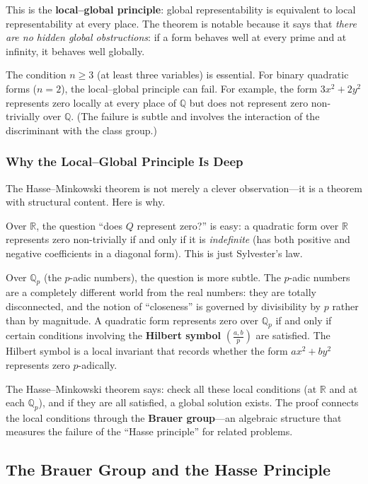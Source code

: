 This is the \textbf{local--global principle}: global representability is equivalent to local representability at every place. The theorem is notable because it says that \emph{there are no hidden global obstructions}: if a form behaves well at every prime and at infinity, it behaves well globally.

\begin{remark}
The condition $n \ge 3$ (at least three variables) is essential. For binary quadratic forms ($n = 2$), the local--global principle can fail. For example, the form $3x^2 + 2y^2$ represents zero locally at every place of $\mathbb{Q}$ but does not represent zero non-trivially over $\mathbb{Q}$. (The failure is subtle and involves the interaction of the discriminant with the class group.)
\end{remark}

\subsubsection{Why the Local--Global Principle Is Deep}

The Hasse--Minkowski theorem is not merely a clever observation---it is a theorem with structural content. Here is why.

Over $\mathbb{R}$, the question ``does $Q$ represent zero?'' is easy: a quadratic form over $\mathbb{R}$ represents zero non-trivially if and only if it is \emph{indefinite} (has both positive and negative coefficients in a diagonal form). This is just Sylvester's law.

Over $\mathbb{Q}_p$ (the $p$-adic numbers), the question is more subtle. The $p$-adic numbers are a completely different world from the real numbers: they are totally disconnected, and the notion of ``closeness'' is governed by divisibility by $p$ rather than by magnitude. A quadratic form represents zero over $\mathbb{Q}_p$ if and only if certain conditions involving the \textbf{Hilbert symbol} $\left(\frac{a, b}{p}\right)$ are satisfied. The Hilbert symbol is a local invariant that records whether the form $ax^2 + by^2$ represents zero $p$-adically.

The Hasse--Minkowski theorem says: check all these local conditions (at $\mathbb{R}$ and at each $\mathbb{Q}_p$), and if they are all satisfied, a global solution exists. The proof connects the local conditions through the \textbf{Brauer group}---an algebraic structure that measures the failure of the ``Hasse principle'' for related problems.

\subsection{The Brauer Group and the Hasse Principle}

